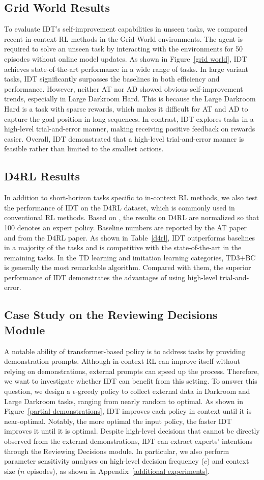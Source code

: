 \documentclass{article}
\theoremstyle{plain}
\theoremstyle{definition}
\theoremstyle{remark}
\begin{document}
\subsection{Grid World Results}
To evaluate IDT’s self-improvement capabilities in unseen tasks, we compared recent in-context RL methods in the Grid World environments. The agent is required to solve an unseen task by interacting with the environments for 50 episodes without online model updates. As shown in Figure~\ref{grid world}, IDT achieves state-of-the-art performance in a wide range of tasks.
In large variant tasks, IDT significantly surpasses the baselines in both efficiency and performance. However, neither AT nor AD showed obvious self-improvement trends, especially in Large Darkroom Hard. This is because the Large Darkroom Hard is a task with sparse rewards, which makes it difficult for AT and AD to capture the goal position in long sequences. In contrast, IDT explores tasks in a high-level trial-and-error manner, making receiving positive feedback on rewards easier. Overall, IDT demonstrated that a high-level trial-and-error manner is feasible rather than limited to the smallest actions.
\subsection{D4RL Results}
In addition to short-horizon tasks specific to in-context RL methods, we also test the performance of IDT on the D4RL dataset, which is commonly used in conventional RL methods. Based on \citet{13}, the results on D4RL are normalized so that 100 denotes an expert policy. Baseline numbers are reported by the AT paper and from the D4RL paper.
As shown in Table~\ref{d4rl}, IDT outperforms baselines in a majority of the tasks and is competitive with the state-of-the-art in the remaining tasks.
In the TD learning and imitation learning categories, TD3+BC is generally the most remarkable algorithm. Compared with them, the superior performance of IDT demonstrates the advantages of using high-level trial-and-error.
\subsection{Case Study on the Reviewing Decisions Module}
A notable ability of transformer-based policy is to address tasks by providing demonstration prompts. Although in-context RL can improve itself without relying on demonstrations, external prompts can speed up the process.
Therefore, we want to investigate whether IDT can benefit from this setting.
To answer this question, we design a $\epsilon$-greedy policy to collect external data in Darkroom and Large Darkroom tasks, ranging from nearly random to optimal.
As shown in Figure~\ref{partial demonstrations}, IDT improves each policy in context until it is near-optimal. Notably, the more optimal the input policy, the faster IDT improves it until it is optimal. Despite high-level decisions that cannot be directly observed from the external demonstrations, IDT can extract experts' intentions through the Reviewing Decisions module. In particular, we also perform parameter sensitivity analyses on high-level decision frequency ($c$) and context size ($n$ episodes), as shown in Appendix~\ref{additional experiments}.
\end{document}
